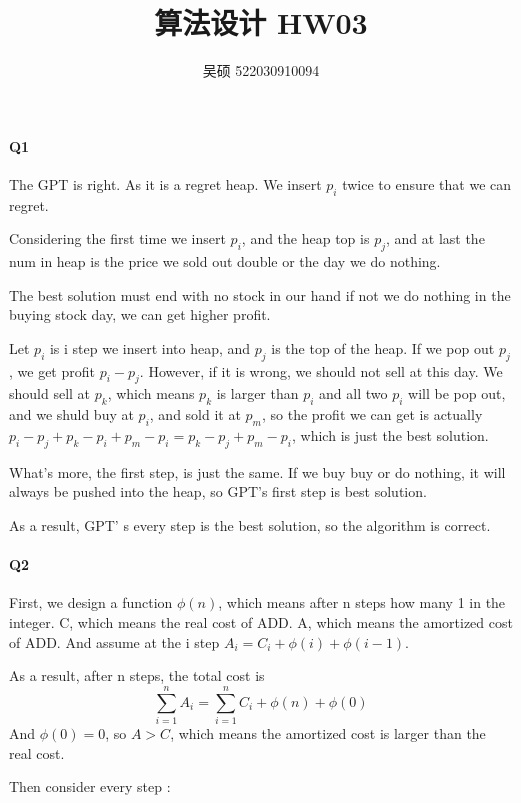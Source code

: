 \documentclass[UTF8]{ctexart}
\renewcommand{\(}{\left(}
\renewcommand{\)}{\right)}
\begin{document}
\title{算法设计 HW03}  
\author{吴硕 522030910094}
\maketitle

\paragraph{Q1} 

The GPT is right. As it is a regret heap. We insert $p_{i}$ twice to ensure that we can regret.

Considering the first time we insert $p_{i}$, and the heap top is $p_{j}$, and at last the num in heap is the price we sold out double or the day we do nothing.

The best solution must end with no stock in our hand if not we do nothing in the buying stock day, we can get higher profit. 

Let $p_{i}$ is i step we insert into heap, and $p_{j}$ is the top of the heap.
If we pop out $p_{j}$ , we get profit $p_{i} - p_{j}$. However, if it is wrong, we should not sell at this day. We should 
sell at $p_{k}$, which means $p_{k}$ is larger than $p_{i}$ and all two $p_{i}$ will be pop out, and we shuld buy at $p_{i}$, and sold it at $p_{m}$, so the profit we can get
is actually $p_{i} - p_{j} + p_{k} - p_{i} + p_{m} - p_{i} = p_{k}- p_{j} + p_{m} - p_{i}$, which is just the best solution. 

What's more, the first step, is just the same. If we buy buy or do nothing, it will always be pushed into the heap, so GPT's first 
step is best solution. 

As a result, GPT' s every step is the best solution, so the algorithm is correct.

\paragraph{Q2}

First, we design a function $\phi(n)$, which means after n steps how many 1 in the integer.  
C, which means the real cost of ADD.  A, which means the amortized cost of ADD. 
And assume at the i step $A_{i} = C_{i} + \phi(i) + \phi(i-1)$. 

As a result, after n steps, the total cost is 
$$\sum_{i=1}^{n} A_{i} = \sum_{i=1}^{n} C_{i} +\phi(n) + \phi(0)$$
And $\phi(0)=0$, so $A > C$, which means the amortized cost is larger than the real cost.

Then consider every step :
\end{document}
